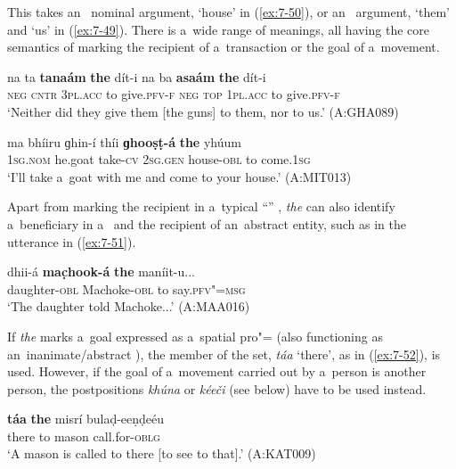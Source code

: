  This  takes an~ nominal argument, `house' in (\ref{ex:7-50}), or an~  argument, `them' and `us' in (\ref{ex:7-49}). There is a~wide range of meanings, all having the core semantics of marking the recipient of a~transaction or the goal of a~movement. 
\begin{exe}
\ex
\label{ex:7-49}
\gll na ta \textbf{tanaám} \textbf{the} dít-i na ba  \textbf{asaám} \textbf{the} dít-i \\
\textsc{neg} \textsc{cntr} \textsc{3pl.acc} to give.\textsc{pfv-f} \textsc{neg} \textsc{top} \textsc{1pl.acc} to give.\textsc{pfv-f} \\
\glt `Neither did they give them [the guns] to them, nor to us.' (A:GHA089)
\end{exe}
\begin{exe}
\ex
\label{ex:7-50}
\gll ma bhíiru ɡhin-í thíi \textbf{ɡhooṣṭ-á} \textbf{the} yhúum \\
\textsc{1sg.nom} he.goat take-\textsc{cv} \textsc{2sg.gen} house-\textsc{obl} to come.\textsc{1sg} \\
\glt `I'll take a~goat with me and come to your house.' (A:MIT013)
\end{exe}

Apart from marking the recipient in a~typical ``'' , \textit{the} can also identify a~beneficiary in a~  and the recipient of an~abstract entity, such as in the utterance in (\ref{ex:7-51}). 

\begin{exe}
\ex
\label{ex:7-51}
\gll dhii-á \textbf{mac̣hook-á} \textbf{the} maníit-u... \\
daughter-\textsc{obl} Machoke-\textsc{obl} to say.\textsc{pfv"=msg} \\
\glt `The daughter told Machoke...' (A:MAA016)
\end{exe}

If \textit{the} marks a~goal expressed as a~spatial pro"= (also functioning as an~in\-animate/abstract  ), the  member of the set, \textit{táa} `there', as in (\ref{ex:7-52}), is used. However, if the goal of a~movement carried out by a~person is another person, the postpositions \textit{khúna} or \textit{kéeči} (see below) have to be used instead.


\begin{exe}
\ex
\label{ex:7-52}
\gll \textbf{táa} \textbf{the} misrí bulaḍ-eeṇḍeéu \\
there to mason call.for-\textsc{oblg}\\
\glt `A mason is called to there [to see to that].' (A:KAT009)
\end{exe}


